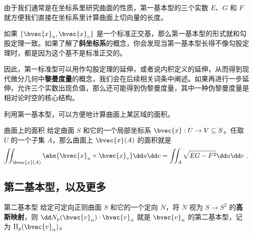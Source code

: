 由于我们通常是在坐标系里研究曲面的性质，第一基本型的三个实数 $E$、$G$ 和 $F$ 就方便我们直接在坐标系里计算曲面上切向量的长度。

如果 $\{\bvec{x}_u, \bvec{x}_v\}$ 是一个标准正交基，那么第一基本型的形式就和勾股定理一致。如果了解了\textbf{斜坐标系}的概念，你会发现当第一基本型长得不像勾股定理时，都是因为这个基不是标准正交的。

因此，第一标准型可以用作勾股定理的延伸，或者说内积定义的延伸，从而得到现代微分几何中\textbf{黎曼度量}的概念，我们会在后续相关词条中阐述。如果再进行一步延伸，允许三个实数出现负值，那么还可能得到伪黎曼度量，其中一种伪黎曼度量是相对论时空的核心结构。

利用第一基本型，可以方便地计算曲面上某区域的面积。

\begin{theorem}{曲面上的面积}
给定曲面 $S$ 和它的一个局部坐标系 $\bvec{x}:U\to V\subseteq S$。任取 $U$ 的一个子集 $A$，那么曲面上 $\bvec{x}(A)$ 的面积就是
\begin{equation}
\iint_{\bvec{x}(A)}\abs{\bvec{x}_u\times\bvec{x}_v}\dd u\dd v=\iint_{A}\sqrt{EG-F^2} \dd u\dd v~.
\end{equation}
\end{theorem}


\subsection{第二基本型，以及更多}

\begin{definition}{第二基本型}
给定可定向正则曲面 $S$ 和它的一个定向 $N$，将 $N$ 视为 $S\to S^2$ 的\textbf{高斯映射}，则 $\dd N_p(\bvec{v}_\alpha)\cdot \bvec{v}_\alpha$ 就是 $\bvec{v}_\alpha$ 的第二基本型，记为 $\mathrm{II}_p(\bvec{v}_\alpha)$。
\end{definition}
